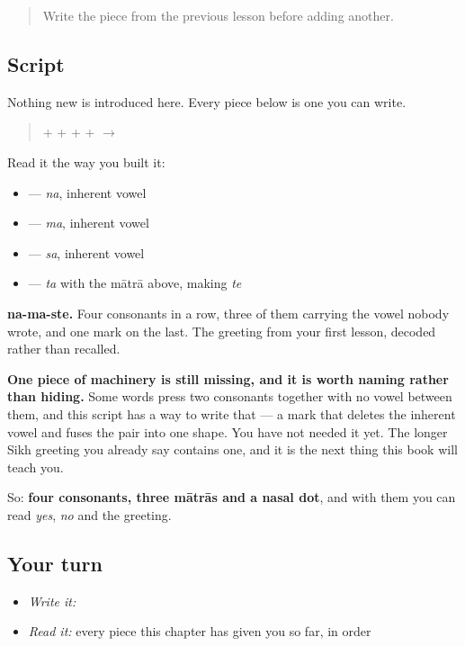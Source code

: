 \label{lesson:PA-W01-namaste-read}



\begin{quote}
Write the piece from the previous lesson before adding another.
\end{quote}

\subsection*{Script}
Nothing new is introduced here. Every piece below is one you can write.

\begin{quote}
\textbf{} + \textbf{} + \textbf{} + \textbf{} + \textbf{} $\to$ \textbf{}
\end{quote}

Read it the way you built it:

\begin{itemize}
\raggedright
  \item \textbf{} — \emph{na}, inherent vowel
  \item \textbf{} — \emph{ma}, inherent vowel
  \item \textbf{} — \emph{sa}, inherent vowel
  \item \textbf{} — \emph{ta} with the mātrā above, making \emph{te}
\end{itemize}

\textbf{na-ma-ste.} Four consonants in a row, three of them carrying the vowel nobody wrote, and one mark on the last. The greeting from your first lesson, decoded rather than recalled.

\textbf{One piece of machinery is still missing, and it is worth naming rather than hiding.} Some words press two consonants together with no vowel between them, and this script has a way to write that — a mark that deletes the inherent vowel and fuses the pair into one shape. You have not needed it yet. The longer Sikh greeting you already say contains one, and it is the next thing this book will teach you.

So: \textbf{four consonants, three mātrās and a nasal dot}, and with them you can read \emph{yes}, \emph{no} and the greeting.

\subsection*{Your turn}
\begin{itemize}
\raggedright
  \item \emph{Write it:} 
  \item \emph{Read it:} every piece this chapter has given you so far, in order
\end{itemize}

